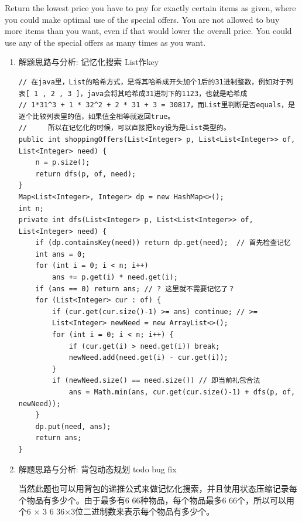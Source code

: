 \documentclass[9pt, b5paaper]{book}
\begin{document}
Return the lowest price you have to pay for exactly certain items as given, where you could make optimal use of the special offers. You are not allowed to buy more items than you want, even if that would lower the overall price. You could use any of the special offers as many times as you want.
\begin{enumerate}
\item 解题思路与分析: 记忆化搜索 List作key
\label{sec-1-0-6-1}
\begin{verbatim}
// 在java里，List的哈希方式，是将其哈希成开头加个1后的31进制整数，例如对于列表[ 1 , 2 , 3 ]，java会将其哈希成31进制下的1123，也就是哈希成
// 1*31^3 + 1 * 32^2 + 2 * 31 + 3 = 30817，而List里判断是否equals，是逐个比较列表里的值，如果值全相等就返回true。
//     所以在记忆化的时候，可以直接把key设为是List类型的。
public int shoppingOffers(List<Integer> p, List<List<Integer>> of, List<Integer> need) {
    n = p.size();
    return dfs(p, of, need);
}
Map<List<Integer>, Integer> dp = new HashMap<>();
int n;
private int dfs(List<Integer> p, List<List<Integer>> of, List<Integer> need) {
    if (dp.containsKey(need)) return dp.get(need);  // 首先检查记忆
    int ans = 0;
    for (int i = 0; i < n; i++) 
        ans += p.get(i) * need.get(i);
    if (ans == 0) return ans; // ? 这里就不需要记忆了？
    for (List<Integer> cur : of) {
        if (cur.get(cur.size()-1) >= ans) continue; // >=
        List<Integer> newNeed = new ArrayList<>();
        for (int i = 0; i < n; i++) {
            if (cur.get(i) > need.get(i)) break;
            newNeed.add(need.get(i) - cur.get(i));
        }
        if (newNeed.size() == need.size()) // 即当前礼包合法
            ans = Math.min(ans, cur.get(cur.size()-1) + dfs(p, of, newNeed));
    }
    dp.put(need, ans);
    return ans;
}
\end{verbatim}
\item 解题思路与分析: 背包动态规划 todo bug fix
\label{sec-1-0-6-2}

当然此题也可以用背包的递推公式来做记忆化搜索，并且使用状态压缩记录每个物品有多少个。由于最多有6 66种物品，每个物品最多6 66个，所以可以用个6 × 3 6\texttimes{} 36×3位二进制数来表示每个物品有多少个。


\end{enumerate}
\end{document}
